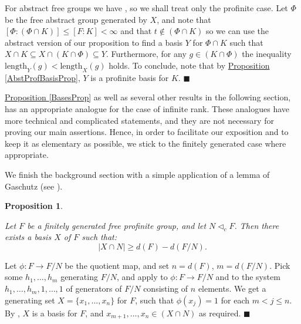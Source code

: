 \documentclass[12pt,a4paper]{article}
\newtheorem{proposition}[theorem]{Proposition}
\newenvironment{proof}[1][Proof]{\begin{trivlist}
\item[\hskip \labelsep {\bfseries #1}]}{\end{trivlist}}
\newcommand{\propref}[1]{\hyperref[#1]{Proposition \ref*{#1}}}
\begin{document}
\begin{proof}

For abstract free groups we have \cite[Proposition 17.5.6]{FJ}, so we shall treat only the profinite case. Let $\Phi$ be the free abstract group generated by $X$, and note that $[\Phi : (\Phi \cap K)] \leq [F : K] < \infty$ and that $t \notin (\Phi \cap K)$ so we can use the abstract version of our proposition to find a basis $Y$ for $\Phi \cap K$ such that $X \cap K \subseteq X \cap (K \cap \Phi) \subseteq Y$. Furthermore, for any $g \in (K \cap \Phi)$ the inequality $\text{length}_Y(g) < \text{length}_X(g)$ holds. To conclude, note that by \propref{AbstProfBasisProp}, $Y$ is a profinite basis for $K$. $\blacksquare$

\end{proof}

\propref{BasesProp} as well as several other results in the following section, has an appropriate analogue for the case of infinite rank. These analogues have more technical and complicated statements, and they are not necessary for proving our main assertions. Hence, in order to facilitate our exposition and to keep it as elementary as possible, we stick to the finitely generated case where appropriate.

We finish the background section with a simple application of a lemma of Gaschutz (see \cite[Lemma 17.7.2]{FJ}).

\begin{proposition} \label{GaschProp}

Let $F$ be a finitely generated free profinite group, and let $N \lhd_c F$. Then there exists a basis $X$ of $F$ such that: $$|X \cap N| \geq d(F) - d(F/N).$$

\end{proposition}

\begin{proof}

Let $\phi \colon F \to F/N$ be the quotient map, and set $n = d(F)$, $m = d(F/N)$. Pick some $h_1, \dots, h_m$ generating $F/N$, and apply \cite[Lemma 17.7.2]{FJ} to $\phi \colon F \to F/N$ and to the system $h_1, \dots, h_m, 1, \dots, 1$ of generators of $F/N$ consisting of $n$ elements. We get a generating set $X = \{x_1, \dots, x_n\}$ for $F$, such that $\phi(x_j) = 1$ for each $m < j \leq n$. By \cite[Lemma 3.3.5 (b)]{RZ}, $X$ is a basis for $F$, and $x_{m+1}, \dots, x_n \in (X \cap N)$ as required. $\blacksquare$

\end{proof}
   
\end{document}
